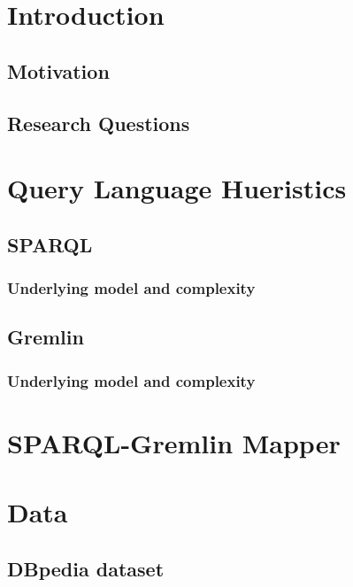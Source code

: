 \documentclass{sig-alternate-05-2015}
\begin{document}
%
%

%
%
\printccsdesc



\section{Introduction}
\subsection{Motivation}
\subsection{Research Questions}

\section{Query Language Hueristics}
\subsection{SPARQL}
\subsubsection{Underlying model and complexity}
\subsection{Gremlin}
\subsubsection{Underlying model and complexity}

\section{SPARQL-Gremlin Mapper}


\section{Data}
\subsection{DBpedia dataset}
\end{document}
